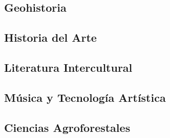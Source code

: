 \subsection{Geohistoria}

\subsection{Historia del Arte}

\subsection{Literatura Intercultural}

\subsection{Música y Tecnología Artística}
\sincodigo

\subsection{Ciencias Agroforestales}
